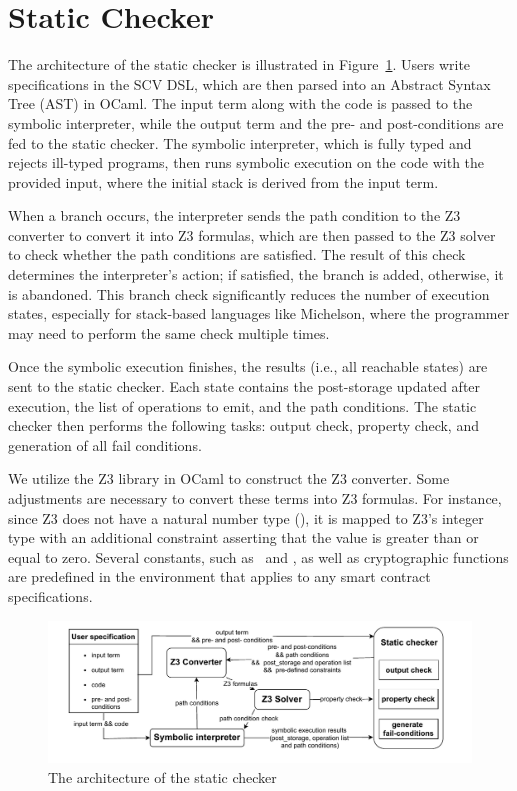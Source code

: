 \documentclass[runningheads]{llncs}
\begin{document}
\section{Static Checker}
\label{sec:static-checker-we}
The architecture of the static checker is illustrated in Figure~\ref{fig:architecture-of-static-checker}. Users write specifications in the SCV DSL, which are then parsed into an Abstract Syntax Tree (AST) in OCaml. The input term along with the code is passed to the symbolic interpreter, while the output term and the pre- and post-conditions are fed to the static checker. The symbolic interpreter, which is fully typed and rejects ill-typed programs, then runs symbolic execution on the code with the provided input, where the initial stack is derived from the input term.

When a branch occurs, the interpreter sends the path condition to the Z3 converter to convert it into Z3 formulas, which are then passed to the Z3 solver to check whether the path conditions are satisfied. The result of this check determines the interpreter's action; if satisfied, the branch is added, otherwise, it is abandoned. This branch check significantly reduces the number of execution states, especially for stack-based languages like Michelson, where the programmer may need to perform the same check multiple times.

Once the symbolic execution finishes, the results (i.e., all reachable states) are sent to the static checker. Each state contains the post-storage updated after execution, the list of operations to emit, and the path conditions. The static checker then performs the following tasks: output check, property check, and generation of all fail conditions.

We utilize the Z3 library in OCaml to construct the Z3 converter. Some adjustments are necessary to convert these terms into Z3 formulas. For instance, since Z3 does not have a natural number type (\TNAT), it is mapped to Z3's integer type with an additional constraint asserting that the value is greater than or equal to zero. Several constants, such as \CAMOUNT\ and \CBALANCE, as well as cryptographic functions are predefined in the environment that applies to any smart contract specifications.

\begin{figure}[tp]
    \centering
    \includegraphics[width=1\textwidth]{scv}
    \caption{The architecture of the static checker}
    \label{fig:architecture-of-static-checker}
\end{figure}
\end{document}
